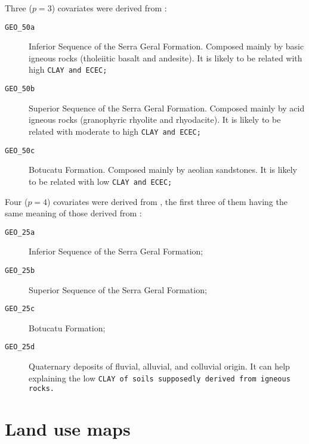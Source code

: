 
Three ($p = 3$) covariates were derived from \geoOld{}:

\begin{description}
 \item[\tt{GEO\_50a}] Inferior Sequence of the Serra Geral Formation. Composed mainly by basic 
 igneous rocks (tholeiitic basalt and andesite). It is likely to be related with high \tt{CLAY} and 
 \tt{ECEC};
 
 \item[\tt{GEO\_50b}] Superior Sequence of the Serra Geral Formation. Composed mainly by acid 
 igneous rocks (granophyric rhyolite and rhyodacite). It is likely to be related with moderate to 
 high \tt{CLAY} and \tt{ECEC};
 
 \item[\tt{GEO\_50c}] Botucatu Formation. Composed mainly by aeolian sandstones. It is likely 
 to be related with low \tt{CLAY} and \tt{ECEC};
\end{description}

Four ($p = 4$) covariates were derived from \geoNew{}, the first three of them having the same meaning 
of those derived from \geoOld{}:

\begin{description}
 \item[\tt{GEO\_25a}] Inferior Sequence of the Serra Geral Formation;
 
 \item[\tt{GEO\_25b}] Superior Sequence of the Serra Geral Formation;
 
 \item[\tt{GEO\_25c}] Botucatu Formation;
 
 \item[\tt{GEO\_25d}] Quaternary deposits of fluvial, alluvial, and colluvial 
 origin. It can help explaining the low \tt{CLAY} of soils supposedly derived from igneous rocks.
\end{description}

\tocless\section{Land use maps}
\label{sec:covar-data-land-use}

